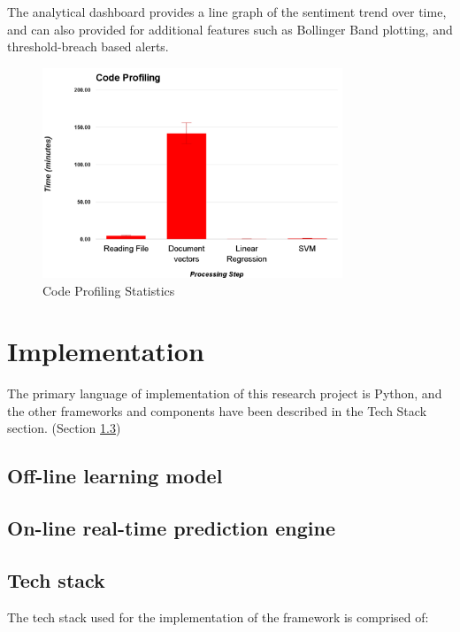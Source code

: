 \documentclass[conference]{IEEEtran}
\begin{document}
        The analytical dashboard provides a line graph of the sentiment trend over time, and can also provided for additional features such as Bollinger Band plotting, and threshold-breach based alerts.

\vspace{5mm}

\begin{figure}[ht]
    \centering
    \includegraphics[width=0.8\textwidth]{images/code_profiling.png}
    \caption{Code Profiling Statistics}
    \label{fig:code-profiling}
\end{figure}

\section{Implementation}

    The primary language of implementation of this research project is Python, and the other frameworks and components have been described in the Tech Stack section. (Section \ref{Tech stack})

    \subsection{Off-line learning model}


    \subsection{On-line real-time prediction engine}


    \subsection{Tech stack} \label{Tech stack}
        The tech stack used for the implementation of the framework is comprised of:
\end{document}
